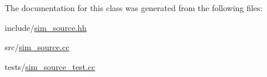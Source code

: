 The documentation for this class was generated from the following files\+:\begin{DoxyCompactItemize}
\item 
include/\mbox{\hyperlink{sim__source_8hh}{sim\+\_\+source.\+hh}}\item 
src/\mbox{\hyperlink{sim__source_8cc}{sim\+\_\+source.\+cc}}\item 
tests/\mbox{\hyperlink{sim__source__test_8cc}{sim\+\_\+source\+\_\+test.\+cc}}\end{DoxyCompactItemize}
